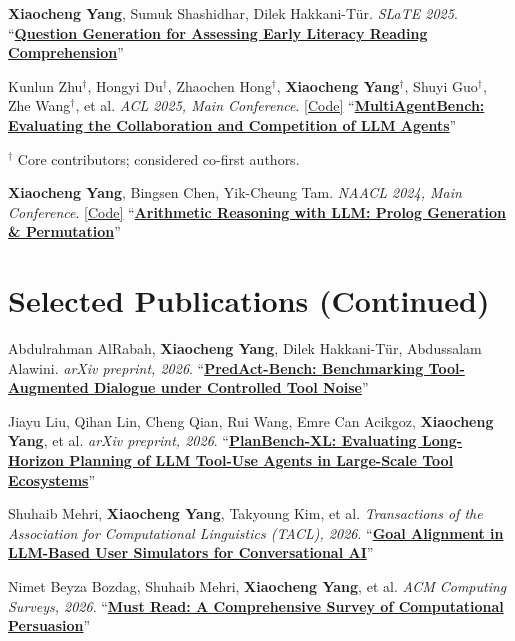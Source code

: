\documentclass[letterpaper]{article}
\newcommand{\pub}[4]{%
  #1 #2 ``\href{#4}{\textbf{#3}}''\par\vspace{1.8pt}
}
\begin{document}
\pub{\textbf{Xiaocheng Yang}, Sumuk Shashidhar, Dilek Hakkani-T{\"u}r.}
    {\textit{SLaTE 2025}.}
    {Question Generation for Assessing Early Literacy Reading Comprehension}
    {https://www.isca-archive.org/slate_2025/yang25b_slate.html}

\pub{Kunlun Zhu$^\dagger$,
  Hongyi Du$^\dagger$,
  Zhaochen Hong$^\dagger$,
  \textbf{Xiaocheng Yang}$^\dagger$,
  Shuyi Guo$^\dagger$,
  Zhe Wang$^\dagger$,
  et al.}
    {\textit{ACL 2025, Main Conference}. \href{https://github.com/ulab-uiuc/MARBLE}{[Code]}}
    {MultiAgentBench: Evaluating the Collaboration and Competition of LLM Agents}
    {https://aclanthology.org/2025.acl-long.421/}
\vspace{-8pt}
{\footnotesize\color{muted}
$^\dagger$ Core contributors; considered co-first authors.
}
\vspace{4pt}

\pub{\textbf{Xiaocheng Yang}, Bingsen Chen, Yik-Cheung Tam.}
    {\textit{NAACL 2024, Main Conference}. \href{https://github.com/yxc-cyber/ProPer}{[Code]}}
    {Arithmetic Reasoning with LLM: Prolog Generation \& Permutation}
    {https://aclanthology.org/2024.naacl-short.61/}

\newpage
\section{Selected Publications (Continued)}

\pub{Abdulrahman AlRabah, \textbf{Xiaocheng Yang}, Dilek Hakkani-T{\"u}r, Abdussalam Alawini.}
    {\textit{arXiv preprint, 2026}.}
    {PredAct-Bench: Benchmarking Tool-Augmented Dialogue under Controlled Tool Noise}
    {https://arxiv.org/abs/2608.02372}

\pub{Jiayu Liu, Qihan Lin, Cheng Qian, Rui Wang, Emre Can Acikgoz, \textbf{Xiaocheng Yang}, et al.}
    {\textit{arXiv preprint, 2026}.}
    {PlanBench-XL: Evaluating Long-Horizon Planning of LLM Tool-Use Agents in Large-Scale Tool Ecosystems}
    {https://arxiv.org/abs/2606.22388}

\pub{Shuhaib Mehri, \textbf{Xiaocheng Yang}, Takyoung Kim, et al.}
    {\textit{Transactions of the Association for Computational Linguistics (TACL), 2026}.}
    {Goal Alignment in LLM-Based User Simulators for Conversational AI}
    {https://doi.org/10.1162/TACL.a.687}

\pub{Nimet Beyza Bozdag, Shuhaib Mehri, \textbf{Xiaocheng Yang}, et al.}
    {\textit{ACM Computing Surveys, 2026}.}
    {Must Read: A Comprehensive Survey of Computational Persuasion}
    {https://doi.org/10.1145/3800687}
\end{document}
